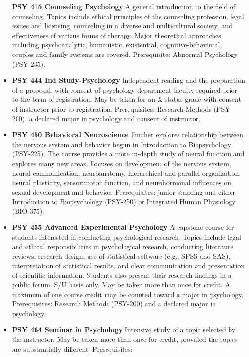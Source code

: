 \documentclass[
  letterpaper,
]{scrbook}
\begin{document}
\begin{itemize}
  \textbf{PSY 415 Counseling Psychology} A general introduction to the
  field of counseling. Topics include ethical principles of the
  counseling profession, legal issues and licensing, counseling in a
  diverse and multicultural society, and effectiveness of various forms
  of therapy. Major theoretical approaches including psychoanalytic,
  humanistic, existential, cognitive-behavioral, couples and family
  systems are covered. Prerequisite: Abnormal Psychology (PSY-235).
\item
  \textbf{PSY 444 Ind Study-Psychology} Independent reading and the
  preparation of a proposal, with consent of psychology department
  faculty required prior to the term of registration. May be taken for
  an X status grade with consent of instructor prior to registration.
  Prerequisites: Research Methods (PSY-200), a declared major in
  psychology and consent of instructor.\\
\item
  \textbf{PSY 450 Behavioral Neuroscience} Further explores relationship
  between the nervous system and behavior begun in Introduction to
  Biopsychology (PSY-225). The course provides a more in-depth study of
  neural function and explores many new areas. Focuses on development of
  the nervous system, neural communication, neuroanatomy, hierarchical
  and parallel organization, neural plasticity, sensorimotor function,
  and neurohormonal influences on sexual development and behavior.
  Prerequisites: junior standing and either Introduction to
  Biopsychology (PSY-250) or Integrated Human Physiology (BIO-375).
\item
  \textbf{PSY 455 Advanced Experimental Psychology} A capstone course
  for students interested in conducting psychological research. Topics
  include legal and ethical responsibilities in psychological research,
  conducting literature reviews, research design, use of statistical
  software (e.g., SPSS and SAS), interpretation of statistical results,
  and clear communication and presentation of scientific information.
  Students also present their research findings in a public forum. S/U
  basis only. May be taken more than once for credit. A maximum of one
  course credit may be counted toward a major in psychology.
  Prerequisites: Research Methods (PSY-200) and a declared major in
  psychology.
\item
  \textbf{PSY 464 Seminar in Psychology} Intensive study of a topic
  selected by the instructor. May be taken more than once for credit,
  provided the topics are substantially different. Prerequisites:

\end{itemize}
\end{document}
